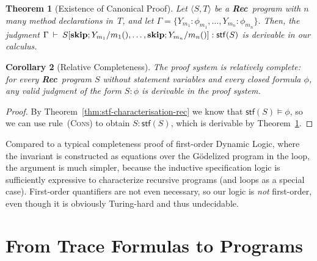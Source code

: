 \documentclass[10pt,a4paper]{amsart}
\newtheorem{theorem}{Theorem}[section]
\newtheorem{corollary}[theorem]{Corollary}
\theoremstyle{definition}
\newcommand{\stfs}[1]{\mathsf{stf} (#1)}
\newcommand{\stfh}[2]{\mathsf{stf}(#1, #2)}
\newcommand{\Rec}{\mbox{\bf Rec}}
\newcommand{\Skip}{\mbox{\bf skip}}
\newcommand{\judge}[2]{#1 : #2}
\newcommand{\sequent}[2]{#1 \>\vdash\> #2}
\begin{document}
\begin{theorem}[Existence of Canonical Proof]
  \label{thm:existence-rec}
  Let $\langle S, T\rangle$ be a \Rec\ program with $n$ many method
  declarations in~$T$, and let
  $
    \Gamma=\{\judge{Y_{m_1}}{\phi_{m_1}},\ldots,\judge{Y_{m_n}}{\phi_{m_n}}\}.
  $
  Then, the judgment
  $
    \sequent{\Gamma}{\judge{S[\Skip;Y_{m_1}/m_1(),\ldots,\Skip;Y_{m_n}/m_n()]}{\stfs{S}}}
  $
  is derivable in our calculus. %
\end{theorem}

\begin{corollary}[Relative Completeness]
  \label{cor:relative-completeness-rec}
  The proof system is relatively complete: for every \Rec\ program $S$
  without statement variables and every closed formula $\phi$, any
  valid judgment of the form $\judge{S}{\phi}$ is derivable in the
  proof system.
\end{corollary}

\begin{proof}
  By Theorem~\ref{thm:stf-characterisation-rec} we know that
  $\stfs{S}\models\phi$, so we can use rule~(\textsc{Cons}) to obtain
  $\judge{S}{\stfs{S}}$, which is derivable by
  Theorem~\ref{thm:existence-rec}. %
\end{proof}

Compared to a typical completeness proof of first-order Dynamic Logic,
where the invariant is constructed as equations over the G\"{o}delized
program in the loop, the argument is much simpler, because the
inductive specification logic is sufficiently expressive to
characterize recursive programs (and loops as a special case).
%
First-order quantifiers are not even necessary, so our logic
is \emph{not} first-order, even though it is obviously Turing-hard and
thus undecidable.


\section{From Trace Formulas to Programs}
\label{sec:canonical-programs}
\end{document}
